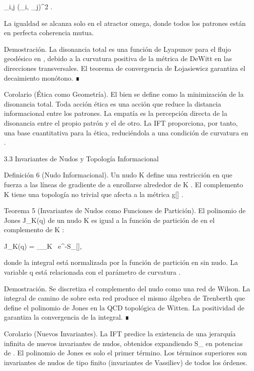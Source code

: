 \documentclass[12pt,twoside]{book}
\begin{document}
 \sum_{i,j} \Delta(\Pi_i, \Pi_j)^2 .

La igualdad se alcanza solo en el atractor omega, donde todos los patrones están en perfecta coherencia mutua.

Demostración. La disonancia total es una función de Lyapunov para el flujo geodésico en   , debido a la curvatura positiva de la métrica de DeWitt en las direcciones transversales. El teorema de convergencia de Łojasiewicz garantiza el decaimiento monótono. ∎

Corolario (Ética como Geometría). El bien se define como la minimización de la disonancia total. Toda acción ética es una acción que reduce la distancia informacional entre los patrones. La empatía es la percepción directa de la disonancia entre el propio patrón y el de otro. La IFT proporciona, por tanto, una base cuantitativa para la ética, reduciéndola a una condición de curvatura en   .

3.3 Invariantes de Nudos y Topología Informacional

Definición 6 (Nudo Informacional). Un nudo  K \subset {}  define una restricción en  \rho  que fuerza a las líneas de gradiente de  \rho  a enrollarse alrededor de  K . El complemento   \setminus K  tiene una topología no trivial que afecta a la métrica  g[\rho] .

Teorema 5 (Invariantes de Nudos como Funciones de Partición). El polinomio de Jones  J_K(q)  de un nudo  K  es igual a la función de partición de  \rho  en el complemento de  K :

J_K(q) = \int_{_{\setminus K}} \rho \, e^{-S_{}[\rho]},

donde la integral está normalizada por la función de partición en    sin nudo. La variable  q  está relacionada con el parámetro de curvatura  \kappa .

Demostración. Se discretiza el complemento del nudo como una red de Wilson. La integral de camino de  \rho  sobre esta red produce el mismo álgebra de Trenberth que define el polinomio de Jones en la QCD topológica de Witten. La positividad de  \rho  garantiza la convergencia de la integral. ∎

Corolario (Nuevos Invariantes). La IFT predice la existencia de una jerarquía infinita de nuevos invariantes de nudos, obtenidos expandiendo  S_{}  en potencias de  \kappa . El polinomio de Jones es solo el primer término. Los términos superiores son invariantes de nudos de tipo finito (invariantes de Vassiliev) de todos los órdenes.
\end{document}

